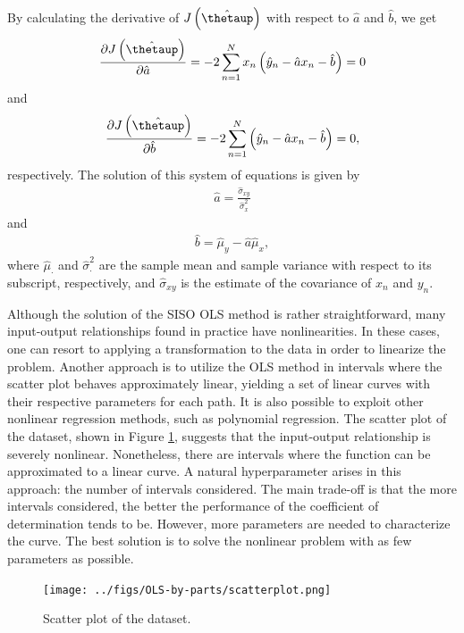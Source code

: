 \documentclass[english]{sobraep}
\begin{document}
By calculating the derivative of \(J\left( \hat{\boldsymbol{\thetaup}} \right)\) with respect to \(\hat{a}\) and \(\hat{b}\), we get
\begin{align}
    \frac{\partial J\left( \hat{\boldsymbol{\thetaup}} \right)}{\partial \hat{a}} = -2 \sum_{n=1}^{N} x_n\left( \hat{y}_n - \hat{a}x_n - \hat{b} \right) = 0
\end{align}
and
\begin{align}
    \frac{\partial J\left( \hat{\boldsymbol{\thetaup}} \right)}{\partial \hat{b}} = -2 \sum_{n=1}^{N} \left( \hat{y}_n - \hat{a}x_n - \hat{b} \right) = 0,
\end{align}
respectively. The solution of this system of equations is given by
\begin{align}
    \hat{a} = \frac{\hat{\sigma}_{xy}}{\hat{\sigma}^2_x}
\end{align}
and
\begin{align}
\hat{b} = \hat{\mu}_y - \hat{a}\hat{\mu}_x,
\end{align}
where \(\hat{\mu}_{\cdot}\) and \(\hat{\sigma}_{\cdot}^2\) are the sample mean and sample variance with respect to its subscript, respectively, and \(\hat{\sigma}_{xy}\) is the estimate of the covariance of \(x_n\) and \(y_n\).

Although the solution of the SISO OLS method is rather straightforward, many input-output relationships found in practice have nonlinearities. In these cases, one can resort to applying a transformation to the data in order to linearize the problem. Another approach is to utilize the OLS method in intervals where the scatter plot behaves approximately linear, yielding a set of linear curves with their respective parameters for each path. It is also possible to exploit other nonlinear regression methods, such as polynomial regression. The scatter plot of the dataset, shown in Figure \ref{fig:scatterplot}, suggests that the input-output relationship is severely nonlinear. Nonetheless, there are intervals where the function can be approximated to a linear curve. A natural hyperparameter arises in this approach: the number of intervals considered. The main trade-off is that the more intervals considered, the better the performance of the coefficient of determination tends to be. However, more parameters are needed to characterize the curve. The best solution is to solve the nonlinear problem with as few parameters as possible.

\begin{figure}[H]
	\texttt{[image: ../figs/OLS-by-parts/scatterplot.png]}
	\centering
	\caption{Scatter plot of the dataset.}
	\label{fig:scatterplot}
\end{figure}
\end{document}
